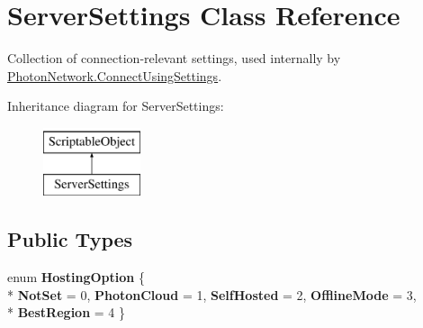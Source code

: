 \hypertarget{class_server_settings}{}\section{Server\+Settings Class Reference}
\label{class_server_settings}


Collection of connection-\/relevant settings, used internally by \hyperlink{class_photon_network_a0fdb79bcce45801ec81fbe56ffb939ec}{Photon\+Network.\+Connect\+Using\+Settings}.  


Inheritance diagram for Server\+Settings\+:\begin{figure}[H]
\begin{center}
\leavevmode
\includegraphics[height=2.000000cm]{class_server_settings}
\end{center}
\end{figure}
\subsection*{Public Types}
\begin{DoxyCompactItemize}
\item 
enum {\bfseries Hosting\+Option} \{ \\*
{\bfseries Not\+Set} = 0, 
{\bfseries Photon\+Cloud} = 1, 
{\bfseries Self\+Hosted} = 2, 
{\bfseries Offline\+Mode} = 3, 
\\*
{\bfseries Best\+Region} = 4
 \}\hypertarget{class_server_settings_ac70398ae8a3414ab1429069965cfcd32}{}\label{class_server_settings_ac70398ae8a3414ab1429069965cfcd32}

\end{DoxyCompactItemize}
